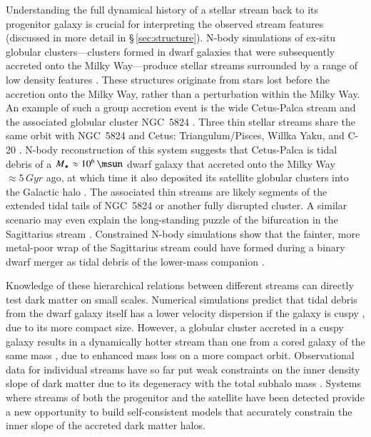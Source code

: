 \documentclass[final,5p,times,twocolumn,authoryear]{elsarticle}
\begin{document}
Understanding the full dynamical history of a stellar stream back to its progenitor galaxy is crucial for interpreting the observed stream features (discussed in more detail in \S\,\ref{sec:structure}).
N-body simulations of ex-situ globular clusters---clusters formed in dwarf galaxies that were subsequently accreted onto the Milky Way---produce stellar streams surrounded by a range of low density features \citep[e.g., wide envelopes, or cocoons, and/or sub-streams;][]{carlberg:2018,carlberg:2020,malhan:2019a,qian:2022}.
These structures originate from stars lost before the accretion onto the Milky Way, rather than a perturbation within the Milky Way.
An example of such a group accretion event is the wide Cetus-Palca stream and the associated globular cluster NGC~5824 \citep{yuan:2019,thomas:2022}.
Three thin stellar streams share the same orbit with NGC~5824 and Cetus: Triangulum/Pisces, Willka Yaku, and C-20 \citep{bonaca:2021, yuan:2022}.
N-body reconstruction of this system suggests that Cetus-Palca is tidal debris of a $M_\star\approx10^6\,\unit{\msun}$ dwarf galaxy that accreted onto the Milky Way $\approx5\,\unit{Gyr}$ ago, at which time it also deposited its satellite globular clusters into the Galactic halo \citep{chang:2020}.
The associated thin streams are likely segments of the extended tidal tails of NGC~5824 or another fully disrupted cluster.
A similar scenario may even explain the long-standing puzzle of the bifurcation in the Sagittarius stream \citep{belokurov:2006, koposov:2012}.
Constrained N-body simulations show that the fainter, more metal-poor wrap of the Sagittarius stream \citep[e.g.,][]{ramos:2022} could have formed  during a binary dwarf merger as tidal debris of the lower-mass companion \citep{davies:2024a,davies:2024b}.

Knowledge of these hierarchical relations between different streams can directly test dark matter on small scales.
Numerical simulations predict that tidal debris from the dwarf galaxy itself has a lower velocity dispersion if the galaxy is cuspy \citep{errani:2015}, due to its more compact size.
However, a globular cluster accreted in a cuspy galaxy results in a dynamically hotter stream than one from a cored galaxy of the same mass \citep{malhan:2021}, due to enhanced mass loss on a more compact orbit.
Observational data for individual streams have so far put weak constraints on the inner density slope of dark matter due to its degeneracy with the total subhalo mass \citep{malhan:2022b}.
Systems where streams of both the progenitor and the satellite have been detected provide a new opportunity to build self-consistent models that accurately constrain the inner slope of the accreted dark matter halos.
\end{document}
